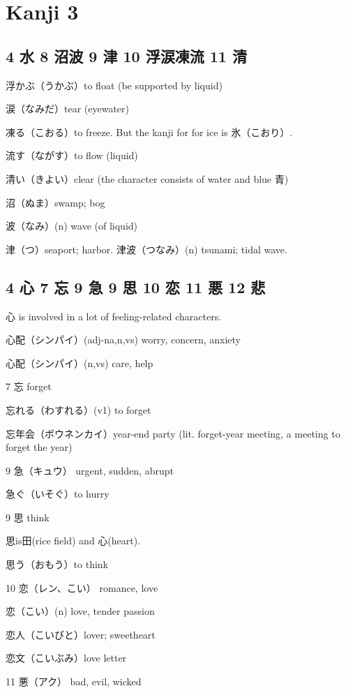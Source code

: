 \chapter{Kanji 3}

\section{4 水 8 沼波 9 津 10 浮涙凍流 11 清}

浮かぶ（うかぶ）to float (be supported by liquid)

涙（なみだ）tear (eyewater)

凍る（こおる）to freeze.
But the kanji for for ice is 氷（こおり）.

流す（ながす）to flow (liquid)

清い（きよい）clear (the character consists of water and blue 青)

沼（ぬま）swamp; bog

波（なみ）(n) wave (of liquid)

津（つ）seaport; harbor.
津波（つなみ）(n) tsunami; tidal wave.

\section{4 心 7 忘 9 急 9 思 10 恋 11 悪 12 悲}

心 is involved in a lot of feeling-related characters.

心配（シンパイ）(adj-na,n,vs) worry, concern, anxiety

心配（シンパイ）(n,vs) care, help

7 忘 forget

忘れる（わすれる）(v1) to forget

忘年会（ボウネンカイ）year-end party (lit. forget-year meeting, a meeting to forget the year)

9 急（キュウ） urgent, sudden, abrupt

急ぐ（いそぐ）to hurry

9 思 think

思is田(rice field) and 心(heart).

思う（おもう）to think

10 恋（レン、こい） romance, love

恋（こい）(n) love, tender passion

恋人（こいびと）lover; sweetheart

恋文（こいぶみ）love letter

11 悪（アク） bad, evil, wicked

